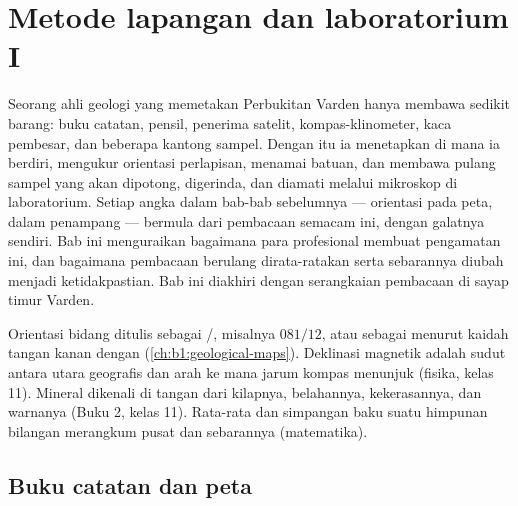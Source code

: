 \chapter{Metode lapangan dan laboratorium I}\label{ch:b1:field-lab-methods-1}

Seorang ahli geologi yang memetakan Perbukitan Varden hanya membawa sedikit barang: buku catatan, pensil, penerima satelit, kompas-klinometer, kaca pembesar, dan beberapa kantong sampel. Dengan itu ia menetapkan di mana ia berdiri, mengukur orientasi perlapisan, menamai batuan, dan membawa pulang sampel yang akan dipotong, digerinda, dan diamati melalui mikroskop di laboratorium. Setiap angka dalam bab-bab sebelumnya --- orientasi pada peta,  dalam penampang --- bermula dari pembacaan semacam ini, dengan galatnya sendiri. Bab ini menguraikan bagaimana para profesional membuat pengamatan ini, dan bagaimana pembacaan berulang dirata-ratakan serta sebarannya diubah menjadi ketidakpastian. Bab ini diakhiri dengan serangkaian pembacaan di sayap timur  Varden.

\begin{recall}
Orientasi bidang ditulis sebagai /, misalnya $081/12$, atau sebagai  menurut kaidah tangan kanan dengan  (\cref{ch:b1:geological-maps}). Deklinasi magnetik adalah sudut antara utara geografis dan arah ke mana jarum kompas menunjuk (fisika, kelas 11). Mineral dikenali di tangan dari kilapnya, belahannya, kekerasannya, dan warnanya (Buku 2, kelas 11). Rata-rata dan simpangan baku suatu himpunan bilangan merangkum pusat dan sebarannya (matematika).
\end{recall}

\section{Buku catatan dan peta}


